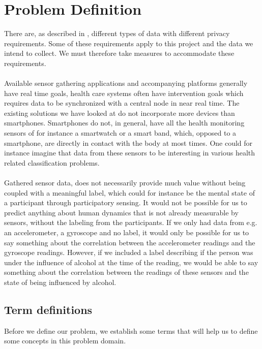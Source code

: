 
\section{Problem Definition} 
\label{sec:problem_definition}
There are, as described in , different types of data with different privacy requirements. Some of these requirements apply to this project and the data we intend to collect. We must therefore take measures to accommodate these requirements.
\\\\
Available sensor gathering applications and accompanying platforms generally have real time goals, health care systems often have intervention goals which requires data to be synchronized with a central node in near real time. The existing solutions we have looked at do not incorporate more devices than smartphones. Smartphones do not, in general, have all the health monitoring sensors of for instance a smartwatch or a smart band, which, opposed to a smartphone, are directly in contact with the body at most times. One could for instance imagine that data from these sensors to be interesting in various health related classification problems. 
\\\\
Gathered sensor data, does not necessarily provide much value without being coupled with a meaningful label, which could for instance be the mental state of a participant through participatory sensing. It would not be possible for us to predict anything about human dynamics that is not already measurable by sensors, without the labeling from the participants. If we only had data from e.g. an accelerometer, a gyroscope and no label, it would only be possible for us to say something about the correlation between the accelerometer readings and the gyroscope readings. However, if we included a label describing if the person was under the influence of alcohol at the time of the reading, we would be able to say something about the correlation between the readings of these sensors and the state of being influenced by alcohol. 

\subsection{Term definitions}
Before we define our problem, we establish some terms that will help us to define some concepts in this problem domain. 

